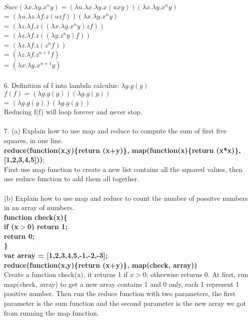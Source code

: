 \documentclass[12pt]{article}
\begin{document}
$Succ(\lambda x.\lambda y.x^{n}y) = (\lambda u.\lambda x.\lambda y.x(uxy))(\lambda x.\lambda y.x^{n}y)$\\
= $(\lambda u.\lambda z.\lambda f.z(uzf))(\lambda x.\lambda y.x^{n}y)$\\
= $(\lambda z.\lambda f.z((\lambda x.\lambda y.x^{n}y)zf))$\\
= $(\lambda z.\lambda f.z((\lambda y.z^{n}y)f))$\\
= $(\lambda z.\lambda f.z(z^{n}f))$\\
= $(\lambda z.\lambda f.z^{n+1}f)$\\
= $(\lambda x.\lambda y.x^{n+1}y)$\\
\vspace{1mm}\\
6. Definition of f into lambda calculus: 
\indent $\lambda g.g(g)$\\
$f(f) = (\lambda g.g(g))(\lambda g.g(g))$\\
= $(\lambda g.g(g))(\lambda g.g(g))$\\
Reducing f(f) will loop forever and never stop.\\
\vspace{1mm}\\
7. (a) Explain how to use map and reduce to compute the sum of first five squares, in one line.\\
\textbf{
reduce(function(x,y)\{return (x+y)\}, map(function(x)\{return  (x*x)\}, [1,2,3,4,5]))};\\
First use map function to create a new list contains all the squared values, then use reduce function to add them all together.\\
\vspace{1mm}\\
(b) Explain how to use map and reduce to count the number of possitve numbers in an array of numbers.\\
\textbf{ function check(x)\{\\
\indent	if (x$>$0) return 1;\\
\indent	return 0;\\
\}\\
var array = [1,2,3,4,5,-1,-2,-3];\\ 
reduce(function(x,y)\{return (x+y)\}, map(check, array))}\\
Create a function check(x), it returns 1 if $x > 0$; otherwise returns 0. At first, run map(check, array) to get a new array contains 1 and 0 only, each 1 represent 1 positive number. Then run the reduce function with two parameters, the first parameter is the sum function and the second parameter is the new array we got from running the map function.\\
\end{document}
